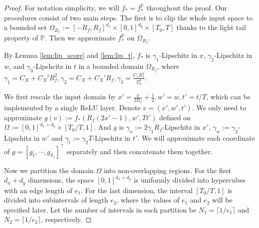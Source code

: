 \documentclass[11pt]{article}
\numberwithin{equation}{section}
\renewcommand{\P}{\mathbb{P}}
\begin{document}
\begin{proof}
    For notation simplicity, we will $f_*=f_*^\P$ throughout the proof.
    Our procedures consist of two main steps.
    The first is to clip the whole input space to a bounded set $\Omega_{R_f}:=[-R_f,R_f]^{d_x}\times[0,1]^{d_y}\times[T_0,T]$ thanks to the light tail property of $\P$. Then we approximate $f_*^\P$ on $\Omega_{R_f}$.
    
    By Lemma \ref{lem:lip_score} and \ref{lem:lip_t}, $f_*$ is $\gamma_1$-Lipschitz in $x$, $\gamma_2$-Lipschitz in $w$, and $\gamma_3$-Lipshcitz in $t$ in a bounded domain $\Omega_{R_f}$, where $\gamma_1=C_X+C_X'R_f^2,\gamma_2=C_X+C_X'R_f,\gamma_3=\frac{C_sR_f^3}{T_0^3}$.
    
    We first rescale the input domain by $x'=\frac{x}{2R_f}+\frac{1}{2}, w'=w,t'=t/T$, which can be implemented by a single ReLU layer.
    Denote $v=(x',w',t')$. We only need to approximate $g(v):=f_*(R_f(2x'-1), w', Tt')$ defined on $\Omega:=[0,1]^{d_x+d_y}\times[T_0/T,1]$.
    And $g$ is $\gamma_x:=2\gamma_1 R_f$-Lipschitz in $x'$, $\gamma_w:=\gamma_2$-Lipschitz in $w'$ and $\gamma_t:=\gamma_2 T$-Lipschitz in $t'$.
    We will approximate each coordinate of $g=[g_{1}, \cdots,g_{d_x}]^\top$ separately and then concatenate them together.

    Now we partition the domain $\Omega$ into non-overlapping regions. For the first $d_x + d_y$ dimensions, the space $[0, 1]^{d_x + d_y}$ is uniformly divided into hypercubes with an edge length of $e_1$. For the last dimension, the interval $[T_0/T, 1]$ is divided into subintervals of length $e_2$, where the values of $e_1$ and $e_2$ will be specified later. Let the number of intervals in each partition be $N_1 = \lceil 1 / e_1 \rceil$ and $N_2 = \lceil 1 / e_2 \rceil$, respectively.


\end{proof}
\end{document}
